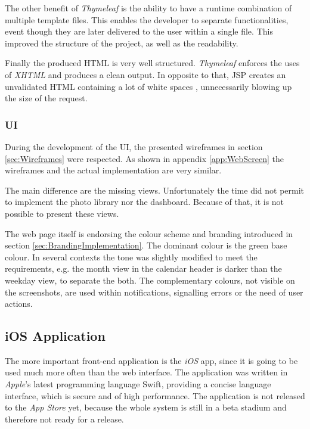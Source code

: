 The other benefit of \emph{Thymeleaf} is the ability to have a runtime combination of multiple template files. This enables the developer to separate functionalities, event though they are later delivered to the user within a single file. This improved the structure of the project, as well as the readability.

Finally the produced \gls{HTML} is very well structured. \emph{Thymeleaf} enforces the uses of \emph{XHTML} and produces a clean output. In opposite to that, \gls{JSP} creates an unvalidated \gls{HTML} containing a lot of white spaces , unnecessarily blowing up the size of the request.

\subsubsection{UI}

During the development of the \gls{UI}, the presented wireframes in section \vref{sec:Wireframes} were respected. As shown in appendix \vref{app:WebScreen} the wireframes and the actual implementation are very similar. 

The main difference are the missing views. Unfortunately the time did not permit to implement the photo library nor the dashboard. Because of that, it is not possible to present these views.

The web page itself is endorsing the colour scheme and branding introduced in section \vref{sec:BrandingImplementation}. The dominant colour is the green base colour. In several contexts the tone was slightly modified to meet the requirements, e.g. the month view in the calendar header is darker than the weekday view, to separate the both. The complementary colours, not visible on the screenshots, are used within notifications, signalling errors or the need of user actions.

\subsection{iOS Application}

The more important front-end application is the \emph{iOS} app, since it is going to be used much more often than the web interface. The application was written in \emph{Apple}'s latest programming language \gls{Swift}, providing a concise language interface, which is secure and of high performance. The application is not released to the \emph{App Store} yet, because the whole system is still in a beta stadium and therefore not ready for a release.

